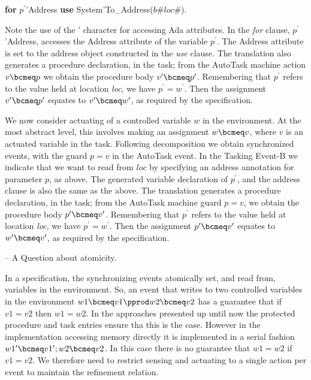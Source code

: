 \begin{center}
\begin{minipage}{0.5\linewidth}
\textbf{for} $p^\prime$'Address \textbf{use} System'To\_Address($b$\#$loc$\#). 
\end{minipage}
\end{center}

\noindent Note the use of the ' character for accessing Ada attributes. In the \emph{for} clause, $p^\prime$'Address, accesses the Address attribute of the variable $p^\prime$. The Address attribute is set to the address object constructed in the \emph{use} clause. The translation also generates a procedure declaration, in the task; from the AutoTask machine action $v\bcmeq p$ we obtain the procedure body $v^\prime \bcmeq p^\prime$. Remembering that $p^\prime$ refers to the value held at location \emph{loc}, we have $p^\prime= w^\prime$. Then the assignment $v^\prime\bcmeq p^\prime$ equates to $v^\prime\bcmeq w^\prime$, as required by the specification.

We now consider actuating of a controlled variable $w$ in the environment. At the most abstract level, this involves making an assignment $w\bcmeq v$, where $v$ is an actuated variable in the task. Following decomposition we obtain synchronized events, with the guard $p = v$ in the AutoTask event. In the Tasking Event-B we indicate that we want to read from $loc$ by specifying an address annotation for parameter $p$, as above. The generated variable declaration of $p^\prime$, and the address clause is also the same as the above. The translation generates a procedure declaration, in the task; from the AutoTask machine guard $p = v$, we obtain the procedure body $p^\prime \bcmeq v^\prime$. Remembering that $p^\prime$ refers to the value held at location \emph{loc}, we have $p^\prime= w^\prime$. Then the assignment $p^\prime\bcmeq v^\prime$ equates to $w^\prime\bcmeq v^\prime$, as required by the specification.

\noindent -- A Question about atomicity.

\noindent In a specification, the synchronizing events atomically set, and read from, variables in the environment. So, an event that writes to two controlled variables in the environment $w1\bcmeq v1 \pprod w2\bcmeq v2$ has a guarantee that if $v1=v2$ then $w1=w2$. In the approaches presented up until now the protected procedure and task entries ensure tha this is the case. However in the implementation accessing memory directly it is implemented in a serial fashion $w1^\prime\bcmeq v1^\prime;  w2\bcmeq v2$. In this case there is no guarantee that $w1=w2$ if $v1=v2$. We therefore need to restrict sensing and actuating to a single action per event to maintain the refinement relation.
%
